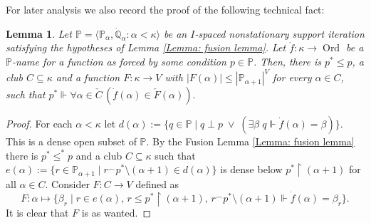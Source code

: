 \documentclass[11pt]{amsart}
\renewcommand{\restriction}{\mathbin\upharpoonright}    %
\newtheorem{lemma}[theorem]{Lemma}
\theoremstyle{definition}
\newcounter{condition}
\theoremstyle{remark}
\newcommand\<{{<}}
\def\s{\subseteq}
\def\forces{\Vdash}
\DeclareMathOperator{\ord}{Ord}
\newcommand{\po}{\mathbb{P}}
\newcommand{\qo}{\mathbb{Q}}
\newcommand{\la}{\langle}
\newcommand{\ra}{\rangle}
\begin{document}
For later analysis we also record the proof of the following technical fact:
\begin{lemma}\label{lemma: capturing functions via fusion}
    Let $\po = \la \po_\alpha, \dot{\qo}_\alpha  \colon \alpha<\kappa \ra$ be an $I$-spaced nonstationary support iteration satisfying the hypotheses of Lemma \ref{Lemma: fusion lemma}. Let $\dot{f}\colon \kappa\rightarrow \ord$ be a $\mathbb{P}$-name for a function as forced by some condition $p\in \mathbb{P}$. Then, there is $p^*\leq p$, a club $C\s\kappa$ and a function $F\colon \kappa\rightarrow V$ with $|F(\alpha)|\leq |\mathbb{P}_{\alpha+1}|^V$ for every $\alpha\in C$, such that $p^*\forces \forall \alpha\in \check{C}\, (\dot{f}(\alpha)\in \check{F}(\alpha)).$  
\end{lemma}
\begin{proof}
  For each $\alpha<\kappa$ let $d(\alpha):=\{q\in \mathbb{P}\mid q\perp p\;\vee\; (\exists\beta\; q\forces \dot{f}(\alpha)=\beta) \}$.  This is a dense open subset of $\mathbb{P}$. By the Fusion Lemma \ref{Lemma: fusion lemma} there is $p^*\leq^* p$ and a club $C\s \kappa$ such that $e(\alpha):=\{r\in \mathbb{P}_{\alpha+1}\mid r{}^\smallfrown p^*\setminus (\alpha+1)\in d(\alpha)\}$ is dense below $p^*\restriction (\alpha+1)$ for all $\alpha\in C$. Consider $F\colon C\rightarrow V$ defined as $$F\colon \alpha\mapsto \{\beta_r\mid r\in e(\alpha),\,r\leq p^*\restriction (\alpha+1),\,r{}^\smallfrown p^*\setminus (\alpha+1)\forces \dot{f}(\alpha)=\beta_r\}.$$
  It is clear that $F$ is as wanted.
\end{proof}

 
\end{document}
